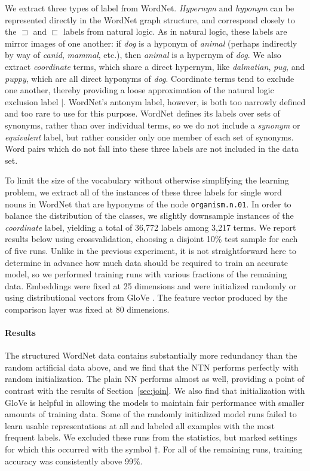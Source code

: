 \documentclass[letterpaper]{article}
\newcommand{\natfor}{\sqsubset}
\newcommand{\natrev}{\sqsupset}
\newcommand{\natalt}{\mathbin{|}}
\def\ii#1{\textit{#1}}
\begin{document}
We extract three types of label from WordNet. \ii{Hypernym} and
\ii{hyponym} can be represented directly in the WordNet graph
structure, and correspond closely to the $\natrev$ and $\natfor$
labels from natural logic. As in natural logic, these labels are
mirror images of one another: if \ii{dog} is a hyponym of \ii{animal}
(perhaps indirectly by way of \ii{canid}, \ii{mammal}, etc.), then
\ii{animal} is a hypernym of \ii{dog}. We also extract \ii{coordinate}
terms, which share a direct hypernym, like \ii{dalmatian}, \ii{pug},
and \ii{puppy}, which are all direct hyponyms of \ii{dog}.  Coordinate
terms tend to exclude one another, thereby providing a loose approximation 
of the natural logic exclusion label $\natalt$. WordNet's antonym label, however, is both too narrowly defined
and too rare to use for this purpose. WordNet defines its labels over
sets of synonyms, rather than over individual terms, so we do not
include a \ii{synonym} or \ii{equivalent} label, but rather
consider only one member of each set of synonyms. Word pairs which do
not fall into these three labels are not included in the data set.

To limit the size of the vocabulary without otherwise simplifying the learning problem, we extract all of the
instances of these three labels for single word nouns in WordNet that are hyponyms of the node 
\texttt{organism.n.01}. In order to balance the distribution of the classes, we slightly downsample instances 
of the \ii{coordinate} label, yielding a total of 36,772 labels among 3,217 terms. We report results below using crossvalidation, choosing a disjoint 10\% test sample for each of five runs. Unlike in the previous experiment,
it is not straightforward here to determine in advance
how much data should be required to train an accurate model, so we performed training runs with 
various fractions of the remaining data. Embeddings were fixed at 25 dimensions and were initialized 
randomly or using distributional vectors from GloVe \cite{pennington2014glove}. The feature vector 
produced by the comparison layer was fixed at 80 dimensions.

\paragraph{Results} 
The structured WordNet data contains substantially more redundancy than the random artificial data above, and we find that the NTN performs perfectly with random initialization. The plain NN performs almost as well, providing
a point of contrast with the results of Section~\ref{sec:join}. We also find that initialization with GloVe is helpful in allowing the models to maintain fair performance
with smaller amounts of training data. Some of the randomly initialized model runs failed to learn
usable representations at all and labeled all examples with the most frequent labels. We excluded these runs from the statistics, but marked settings for which this occurred with the symbol $\dagger$. For all of the remaining runs, training accuracy was consistently above 99\%.
\end{document}
